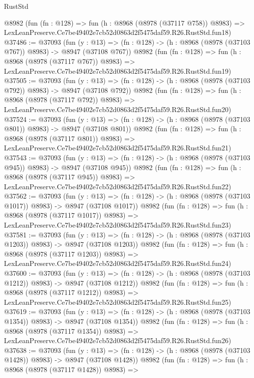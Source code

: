 \begin{lexlean}{RustStd}
\begin{coremodule}
    @8982
    (fun (fn : @128) =>
    fun (h : @8968 (@8978 (@37117 @758)) @8983) =>
    LexLeanPreserve.Ce7be49402e7cb52d0863d2f5475daf59.R26.RustStd.fun18)
@37486 := @37093
    (fun (y : @13) => (fn : @128) -> (h : @8968 (@8978 (@37103 @767)) @8983) -> @8947 (@37108 @767))
    @8982
    (fun (fn : @128) =>
    fun (h : @8968 (@8978 (@37117 @767)) @8983) =>
    LexLeanPreserve.Ce7be49402e7cb52d0863d2f5475daf59.R26.RustStd.fun19)
@37505 := @37093
    (fun (y : @13) => (fn : @128) -> (h : @8968 (@8978 (@37103 @792)) @8983) -> @8947 (@37108 @792))
    @8982
    (fun (fn : @128) =>
    fun (h : @8968 (@8978 (@37117 @792)) @8983) =>
    LexLeanPreserve.Ce7be49402e7cb52d0863d2f5475daf59.R26.RustStd.fun20)
@37524 := @37093
    (fun (y : @13) => (fn : @128) -> (h : @8968 (@8978 (@37103 @801)) @8983) -> @8947 (@37108 @801))
    @8982
    (fun (fn : @128) =>
    fun (h : @8968 (@8978 (@37117 @801)) @8983) =>
    LexLeanPreserve.Ce7be49402e7cb52d0863d2f5475daf59.R26.RustStd.fun21)
@37543 := @37093
    (fun (y : @13) => (fn : @128) -> (h : @8968 (@8978 (@37103 @945)) @8983) -> @8947 (@37108 @945))
    @8982
    (fun (fn : @128) =>
    fun (h : @8968 (@8978 (@37117 @945)) @8983) =>
    LexLeanPreserve.Ce7be49402e7cb52d0863d2f5475daf59.R26.RustStd.fun22)
@37562 := @37093
    (fun (y : @13) =>
    (fn : @128) -> (h : @8968 (@8978 (@37103 @1017)) @8983) -> @8947 (@37108 @1017))
    @8982
    (fun (fn : @128) =>
    fun (h : @8968 (@8978 (@37117 @1017)) @8983) =>
    LexLeanPreserve.Ce7be49402e7cb52d0863d2f5475daf59.R26.RustStd.fun23)
@37581 := @37093
    (fun (y : @13) =>
    (fn : @128) -> (h : @8968 (@8978 (@37103 @1203)) @8983) -> @8947 (@37108 @1203))
    @8982
    (fun (fn : @128) =>
    fun (h : @8968 (@8978 (@37117 @1203)) @8983) =>
    LexLeanPreserve.Ce7be49402e7cb52d0863d2f5475daf59.R26.RustStd.fun24)
@37600 := @37093
    (fun (y : @13) =>
    (fn : @128) -> (h : @8968 (@8978 (@37103 @1212)) @8983) -> @8947 (@37108 @1212))
    @8982
    (fun (fn : @128) =>
    fun (h : @8968 (@8978 (@37117 @1212)) @8983) =>
    LexLeanPreserve.Ce7be49402e7cb52d0863d2f5475daf59.R26.RustStd.fun25)
@37619 := @37093
    (fun (y : @13) =>
    (fn : @128) -> (h : @8968 (@8978 (@37103 @1354)) @8983) -> @8947 (@37108 @1354))
    @8982
    (fun (fn : @128) =>
    fun (h : @8968 (@8978 (@37117 @1354)) @8983) =>
    LexLeanPreserve.Ce7be49402e7cb52d0863d2f5475daf59.R26.RustStd.fun26)
@37638 := @37093
    (fun (y : @13) =>
    (fn : @128) -> (h : @8968 (@8978 (@37103 @1428)) @8983) -> @8947 (@37108 @1428))
    @8982
    (fun (fn : @128) =>
    fun (h : @8968 (@8978 (@37117 @1428)) @8983) =>

\end{coremodule}
\end{lexlean}
